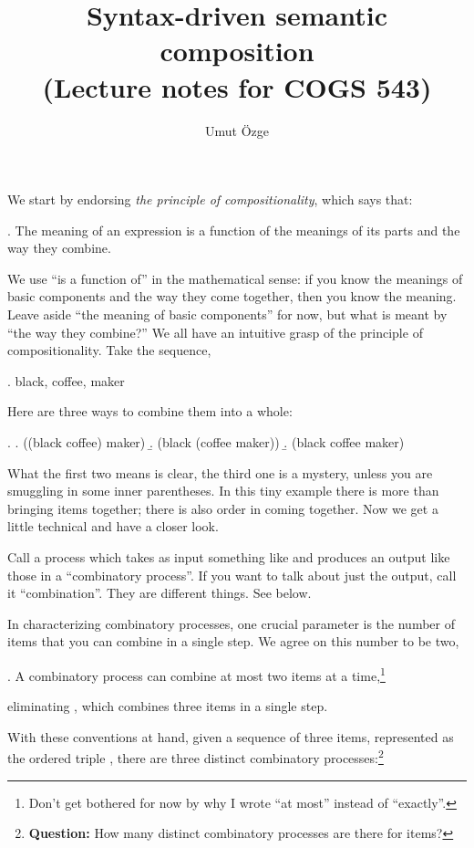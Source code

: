 \documentclass[11pt,a4paper]{article}
\title{Syntax-driven semantic composition\\ \small (Lecture notes for COGS 543)}
\author{Umut \"Ozge}
\begin{document}
\maketitle

\noindent We start by endorsing \emph{the principle of compositionality}, which says that:

\ex. The meaning of an expression is a function of the meanings of its parts and the way they combine.

We use ``is a function of'' in the mathematical sense: if you know the meanings of basic components
and the way they come together, then you know the meaning.  Leave aside ``the
meaning of basic components'' for now, but what is meant by ``the way they
combine?'' We all have an intuitive grasp of the principle of compositionality. Take the sequence,

\ex.\label{coffeeseq}  black, coffee, maker

Here are three ways to combine them into a whole:

\ex.\label{coffeeseqB} \a.\label{coffeeseqL} ((black coffee) maker)
\b.\label{coffeeseqR} (black (coffee maker))
\b.\label{coffeeseqF}  (black coffee maker)


What the first two means is clear, the third one is a mystery, unless you are smuggling in some inner parentheses. In this tiny example there is more than bringing items together; there is also order in coming together. Now we get a little technical and have a closer look.

Call a process which takes as input something like  and produces an output like those in  a ``combinatory process''.  If you want to talk about just the output, call it ``combination''. They are different things. See below.

In characterizing combinatory processes, one crucial parameter is the number of items that you can combine in a single step. We agree on this number to be two,

\ex. A combinatory process can combine at most two items at a time,\footnote{Don't get bothered for now by why I wrote ``at most'' instead of ``exactly''.}

eliminating , which combines three items in a single step.

With these conventions at hand, given a sequence of three items, represented as the ordered triple , there are three distinct combinatory processes:\footnote{{\bf Question:} How many distinct combinatory processes are there for  items?}
\end{document}
